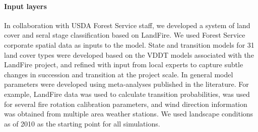 \documentclass[12pt]{article}
\begin{document}
\begin{spacing}{1}
\paragraph{Input layers}
In collaboration with USDA Forest Service staff, we developed a system of land cover and seral stage classification based on LandFire. We used Forest Service corporate spatial data as inputs to the model. State and transition models for 31 land cover types were developed based on the VDDT models associated with the LandFire project, and refined with input from local experts to capture subtle changes in succession and transition at the project scale. In general model parameters were developed using meta-analyses published in the literature. For example, LandFire data was used to calculate transition probabilities, \citet{Mallek2013} was used for several fire rotation calibration parameters, and wind direction information was obtained from multiple area weather stations. We used landscape conditions as of 2010 as the starting point for all simulations.



\end{spacing}
\end{document}
